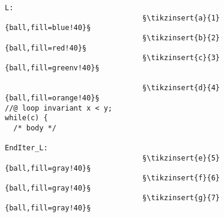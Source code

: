 \begin{figure}[bt]
  \begin{minipage}{0.65\textwidth}
  \end{minipage}\hfill
  \begin{minipage}{0.49\textwidth}
    \begin{lstlisting}[escapechar=§]
L:
                                §\tikzinsert{a}{1}{ball,fill=blue!40}§
                                §\tikzinsert{b}{2}{ball,fill=red!40}§
                                §\tikzinsert{c}{3}{ball,fill=greenv!40}§

                                §\tikzinsert{d}{4}{ball,fill=orange!40}§
//@ loop invariant x < y;
while(c) {
  /* body */

EndIter_L:
                                §\tikzinsert{e}{5}{ball,fill=gray!40}§
                                §\tikzinsert{f}{6}{ball,fill=gray!40}§
                                §\tikzinsert{g}{7}{ball,fill=gray!40}§


\end{lstlisting}
\end{minipage}
\end{figure}

